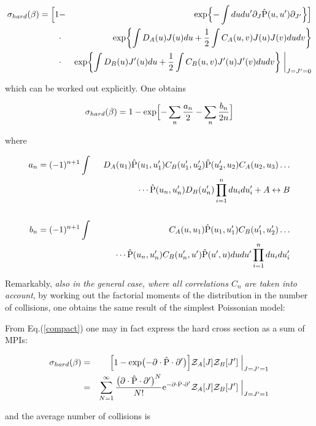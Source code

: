 \documentclass{ws-rv9x6}
\begin{document}
\begin{eqnarray}\sigma_{hard}(\beta)=
  \Bigl[ 1&-&{\rm exp}\Bigl\{{-\int dudu'{\partial_J}\hat{\rm P}(u,u')
  {\partial_{J'}}}\Bigr\}\Bigr]\cr&\cdot&
  {\rm exp}\biggl\{\int D_A(u)J(u)du+{1\over 2}\int C_A(u,v)J(u)J(v)
         dudv\biggr\}\\
  &\cdot &{\rm exp}\biggl\{\int D_B(u)J'(u)du+{1\over 2}\int C_B(u,v)J'(u)J'(v)
         dudv\biggr\}
\biggm|_{J=J'=0}\nonumber\end{eqnarray}

\noindent which can be worked out explicitly. One 
obtains\cite{Calucci:1991qq}

\begin{eqnarray}\label{exponential}\sigma_{hard}(\beta)=1-{\rm exp}\Bigl[-\sum_n{a_n\over 2}-\sum_n{b_n\over 2n}\Bigr]
\end{eqnarray}

\noindent where

\begin{eqnarray}\label{a_n}
a_n=(-1)^{n+1}\int&& D_A(u_1)\hat{\rm P}(u_1,u_1')C_B(u_1',u_2')
       \hat{\rm P}(u_2',u_2)
       C_A(u_2,u_3)\dots\cr
       &&\qquad\cdots
       \hat{\rm P}(u_n,u_n')D_B(u_n')
  \prod_{i=1}^ndu_idu_i'+A\leftrightarrow B\cr
&&\cr
b_n=(-1)^{n+1}\int &&C_A(u,u_1)\hat{\rm P}(u_1,u_1')C_B(u_1',u_2')
           \dots\\
           &&\qquad\cdots\hat{\rm P}(u_n,u_n')C_B(u_n',u')\hat{\rm P}(u',u)
       dudu'\prod_{i=1}^ndu_idu_i'
       \nonumber
       \end{eqnarray}

Remarkably, {\it also in the general case, where all correlations $C_n$ are taken into account}, by working out the factorial moments of the distribution in the number of collisions, one obtains the same result of the simplest Poissonian model: 

From Eq.(\ref{compact}) one may in fact express the hard
cross section as a sum of MPIs:

\begin{eqnarray}\label{shardc}\sigma_{hard}(\beta)&=&\Bigl[ 1-{\rm exp}\bigl(-\partial\cdot\hat{\rm P}\cdot\partial'\bigr)\Bigr]
  {\cal Z}_A[J]{\cal Z}_B[J']\Bigm|_{J=J'=1}\cr
  &=&\sum_{N=1}^{\infty}{\bigl(\partial\cdot\hat{\rm P}\cdot\partial'\bigr)^N\over{N !} } {\rm e}^{-\partial\cdot\hat{\rm P}\cdot\partial'}
  {\cal Z}_A[J]{\cal Z}_B[J']\Bigm|_{J=J'=1}
\end{eqnarray}

\noindent and the average number of collisions is
\end{document}
